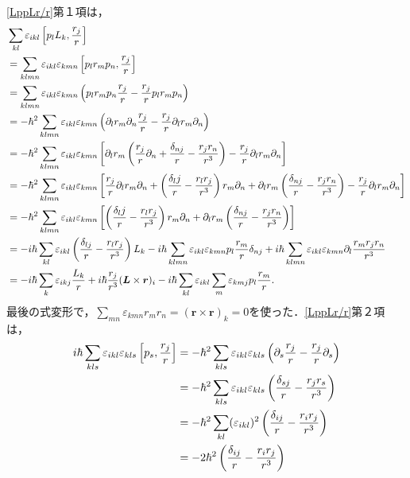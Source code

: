 \eqref{LppLr/r}第１項は，
\begin{align}
  & \sum_{kl}\varepsilon_{ikl}\left[p_lL_k,\frac{r_j}{r}\right] \\
  & = \sum_{klmn}\varepsilon_{ikl}\varepsilon_{kmn}\left[p_lr_mp_n,\frac{r_j}{r}\right]\notag\\
  & = \sum_{klmn}\varepsilon_{ikl}\varepsilon_{kmn}\left(p_lr_mp_n\frac{r_j}{r} - \frac{r_j}{r}p_lr_mp_n\right)\notag\\
  & = - \hbar^2\sum_{klmn}\varepsilon_{ikl}\varepsilon_{kmn}\left(\partial_lr_m\partial_n\frac{r_j}{r} - \frac{r_j}{r}\partial_lr_m\partial_n\right)\notag\\
  & = - \hbar^2\sum_{klmn}\varepsilon_{ikl}\varepsilon_{kmn}\left[\partial_lr_m\left(\frac{r_j}{r}\partial_n + \frac{\delta_{nj}}{r} - \frac{r_jr_n}{r^3}\right) - \frac{r_j}{r}\partial_lr_m\partial_n\right]\notag\\
  & = - \hbar^2\sum_{klmn}\varepsilon_{ikl}\varepsilon_{kmn}\left[\frac{r_j}{r}\partial_lr_m\partial_n + \left(\frac{\delta_lj}{r} - \frac{r_lr_j}{r^3}\right)r_m\partial_n + \partial_lr_m\left(\frac{\delta_{nj}}{r} - \frac{r_jr_n}{r^3}\right) - \frac{r_j}{r}\partial_lr_m\partial_n\right]\notag\\
  & = - \hbar^2\sum_{klmn}\varepsilon_{ikl}\varepsilon_{kmn}\left[\left(\frac{\delta_lj}{r} - \frac{r_lr_j}{r^3}\right)r_m\partial_n + \partial_lr_m\left(\frac{\delta_{nj}}{r} - \frac{r_jr_n}{r^3}\right)\right]\notag\\
  & = - i\hbar\sum_{kl}\varepsilon_{ikl}\left(\frac{\delta_{lj}}{r} - \frac{r_lr_j}{r^3}\right)L_k - i\hbar\sum_{klmn}\varepsilon_{ikl}\varepsilon_{kmn}p_l\frac{r_m}{r}\delta_{nj} + i\hbar\sum_{klmn}\varepsilon_{ikl}\varepsilon_{kmn}\partial_l\frac{r_mr_jr_n}{r^3}\notag\\
  & = - i\hbar\sum_{k}\varepsilon_{ikj}\frac{L_k}{r} + i\hbar\frac{r_j}{r^3}(\boldsymbol{L}\times\boldsymbol{r})_i - i\hbar\sum_{kl}\varepsilon_{ikl}\sum_m\varepsilon_{kmj}p_l\frac{r_m}{r}.\label{LppLr/r_1}
\end{align}
最後の式変形で，$\sum_{mn}\varepsilon_{kmn}r_mr_n=(\boldsymbol{r}\times\boldsymbol{r})_k=0$を使った．\eqref{LppLr/r}第２項は，
\begin{align}
  i\hbar\sum_{kls}\varepsilon_{ikl}\varepsilon_{kls}\left[p_s,\frac{r_j}{r}\right]
  & = - \hbar^2\sum_{kls}\varepsilon_{ikl}\varepsilon_{kls}\left(\partial_s\frac{r_j}{r} - \frac{r_j}{r}\partial_s\right)\notag\\
  & = - \hbar^2\sum_{kls}\varepsilon_{ikl}\varepsilon_{kls}\left(\frac{\delta_{sj}}{r} - \frac{r_jr_s}{r^3}\right)\notag\\
  & = - \hbar^2\sum_{kl}(\varepsilon_{ikl})^2\left(\frac{\delta_{ij}}{r} - \frac{r_ir_j}{r^3}\right)\notag\\
  & = - 2\hbar^2\left(\frac{\delta_{ij}}{r} - \frac{r_ir_j}{r^3}\right)\label{LppLr/r_2}
\end{align}
